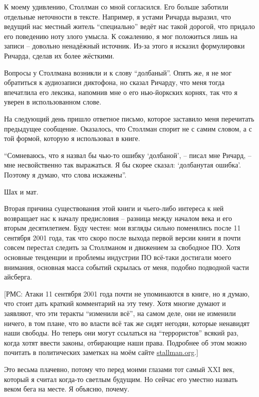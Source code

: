 К моему удивлению, Столлман со мной согласился. Его больше заботили
отдельные неточности в тексте. Например, я устами Ричарда выразил, что
ведущий нас местный житель \enquote{специально} ведёт нас такой дорогой,
что придало его поведению ноту злого умысла. К сожалению, я мог
положиться лишь на записи -- довольно ненадёжный источник. Из-за
этого я исказил формулировки Ричарда, сделав их более жёсткими.

Вопросы у Столлмана возникли и к слову \enquote{долбаный}. Опять же, я не
мог обратиться к аудиозаписи диктофона, но сказал Ричарду, что меня
тогда впечатлила его лексика, напомнив мне о его нью-йоркских корнях,
так что я уверен в использованном слове.

На следующий день пришло ответное письмо, которое заставило меня
перечитать предыдущее сообщение. Оказалось, что Столлман спорит
не с самим словом, а с той формой, которую я использовал в книге.

\enquote{Сомневаюсь, что я назвал бы чью-то ошибку \enquote{долбаной}, -- писал
мне Ричард, -- мне несвойственно так выражаться. Я бы скорее сказал:
\enquote{долбанутая ошибка}. Поэтому я думаю, что слова искажены}.

Шах и мат.

Вторая причина существования этой книги и чьего-либо интереса к
ней возвращает нас к началу предисловия -- разница между началом
века и его вторым десятилетием. Буду честен: мои взгляды сильно
поменялись после 11 сентября 2001 года, так что скоро после выхода
первой версии книги я почти совсем перестал следить за Столлманом
и движением за свободное ПО. Хотя основные тенденции и проблемы
индустрии ПО всё-таки достигали моего внимания, основная масса
событий скрылась от меня, подобно подводной части айсберга.

[РМС: Атаки 11 сентября 2001 года почти не упоминаются в книге,
 но я думаю, что стоит дать краткий комментарий на эту тему. Хотя
 многие думают и заявляют, что эти теракты \enquote{изменили всё}, на
 самом деле, они не изменили ничего, в том плане, что во власти
 всё так же сидят негодяи, которые ненавидят наши свободы. Но
 теперь они могут ссылаться на \enquote{террористов} всякий раз, когда
 хотят ввести законы, отбирающие наши права. Подробнее об
 этом можно почитать в политических заметках на моём сайте
 \url{stallman.org}.]

Это весьма плачевно, потому что перед моими глазами тот самый
XXI век, который я считал когда-то светлым будущим. Но сейчас
его уместно назвать веком бега на месте. Я объясню, почему.

